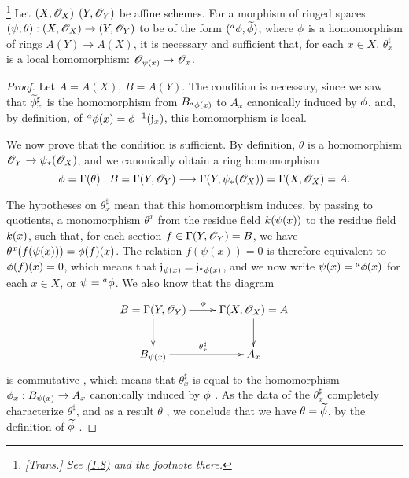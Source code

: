 \begin{theorem}[1.7.3]
\label{I.1.7.3}
\footnote{\emph{[Trans.] See \hyperref[subsection:I.1.8]{(1.8)} and the footnote there.}}
Let $(X,\mathscr{O}_X)$  $(Y,\mathscr{O}_Y)$ be affine schemes.
For a morphism of ringed spaces $(\psi,\theta):(X,\sh{O}_X)\to(Y,\sh{O}_Y)$ to be of the form $({}^a\phi,\widetilde{\phi})$, where $\phi$ is a homomorphism of rings $A(Y)\to A(X)$, it is necessary and sufficient that, for each $x\in X$, $\theta_x^\sharp$ is a local homomorphism: $\sh{O}_{\psi(x)}\to\sh{O}_x$.
\end{theorem}

\begin{proof}
\label{proof-I.1.7.3}
Let $A=A(X)$, $B=A(Y)$.
The condition is necessary, since we saw  that $\widetilde{\phi}_x^\sharp$ is the homomorphism from $B_{{}^a\phi(x)}$ to $A_x$ canonically induced by $\phi$, and, by definition, of ${}^a\phi(x)=\phi^{-1}(\mathfrak{j}_x)$, this homomorphism is local.

We now prove that the condition is sufficient.
By definition, $\theta$ is a homomorphism $\sh{O}_Y\to\psi_*(\sh{O}_X)$, and we canonically obtain a ring homomorphism
\[
  \vphi=\Gamma(\theta):B=\Gamma(Y,\sh{O}_Y)
  \to\Gamma(Y,\psi_*(\sh{O}_X))=\Gamma(X,\sh{O}_X)=A.
\]

The hypotheses on $\theta_x^\sharp$ mean that this homomorphism induces, by passing to quotients, a monomorphism $\theta^x$ from the residue field $k(\psi(x))$ to the residue field $k(x)$, such that, for each section $f\in\Gamma(Y,\mathscr{O}_Y)=B$, we have $\theta^x(f(\psi(x)))=\phi(f)(x)$.
The relation $f(\psi(x))=0$ is therefore equivalent to $\phi(f)(x)=0$, which means that $\mathfrak{j}_{\psi(x)}=\mathfrak{j}_{{}^a\phi(x)}$, and we now write $\psi(x)={}^a\phi(x)$ for each $x\in X$, or $\psi={}^a\phi$.
We also know that the diagram
\[
  \xymatrix{
    B=\Gamma(Y,\sh{O}_Y)\ar[r]^\vphi\ar[d] &
    \Gamma(X,\sh{O}_X)=A\ar[d]\\
    B_{\psi(x)}\ar[r]^{\theta_x^\sharp} &
    A_x
  }
\]
is commutative , which means that $\theta_x^\sharp$ is equal to the homomorphism $\vphi_x:B_{\psi(x)}\to A_x$ canonically induced by $\phi$ .
As the data of the $\theta_x^\sharp$ completely characterize $\theta^\sharp$, and as a result $\theta$ , we conclude that we have $\theta=\widetilde{\phi}$, by the definition of $\widetilde{\phi}$ .
\end{proof}

